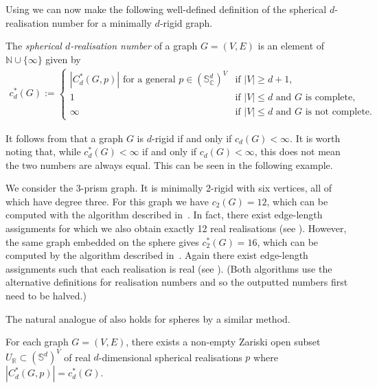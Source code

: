 \documentclass[ALCO]{cedram}
\begin{document}
Using  we can now make the following well-defined definition of the spherical $d$-realisation number for a minimally $d$-rigid graph.

\begin{definition}\label{def:countsphere}
	The \emph{spherical $d$-realisation number} of a graph $G=(V,E)$ is an element of $\mathbb{N} \cup \{\infty\}$ given by
	\begin{align*}
		c^*_d(G) :=		
		\begin{cases}
			|C^*_d(G,p)| \text{ for a general $p \in (\mathbb{S}_\mathbb{C}^d)^V$} &\text{if } |V| \geq d+1, \\
			 1 &\text{if } |V| \leq d \text{ and $G$ is complete}, \\
			 \infty &\text{if } |V| \leq d \text{ and $G$ is not complete}.
		\end{cases}
	\end{align*}
\end{definition}

It follows from  that a graph $G$ is $d$-rigid if and only if $c_d(G) < \infty$.
It is worth noting that,
while $c^*_d(G) < \infty$ if and only if $c_d(G) < \infty$,
this does not mean the two numbers are always equal.
This can be seen in the following example.

\begin{example}
  We consider the 3-prism graph.
  It is minimally 2-rigid with six vertices, all of which have degree three.
  For this graph we have $c_2(G)=12$, which can be computed with the algorithm described in~\cite{PlaneCount}.
  In fact, there exist edge-length assignments for which we also obtain exactly 12 real realisations (see ).
  However, the same graph embedded on the sphere gives $c_2^*(G)=16$,
  which can be computed by the algorithm described in~\cite{SphereCount}.
  Again there exist edge-length assignments such that each realisation is real (see ).
  (Both algorithms use the alternative definitions for realisation numbers and so the outputted numbers first need to be halved.)
\end{example}

The natural analogue of  also holds for spheres by a similar method.

\begin{corollary}\label{cor:sphrealstuff}
	For each graph $G=(V,E)$,
	there exists a non-empty Zariski open subset $U_\mathbb{R} \subset (\mathbb{S}^d)^V$ of real $d$-dimensional spherical realisations $p$ where $|C^*_d(G,p)| = c^*_d(G)$.
\end{corollary}
\end{document}
